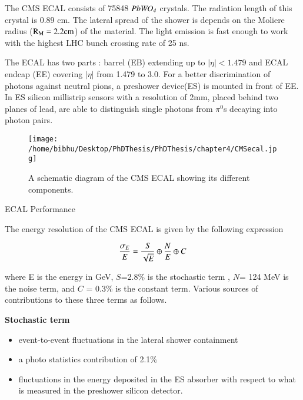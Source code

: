 The CMS ECAL consists of 75848 $\it PbWO_{4}$ crystals. The radiation length of this crystal is 0.89 cm. The lateral spread of the shower is depends on the Moliere radius ($\rm R_{M}= 2.2 cm$) of the material. The light emission is fast enough to work with the highest LHC bunch crossing rate of 25 ns. 

The ECAL has two parts :  barrel (EB) extending up to $|\eta| < 1.479$ and ECAL endcap (EE) covering $|\eta|$ from 1.479 to 3.0.  For a better discrimination of photons against neutral pions, a preshower device(ES) is mounted in front of EE. In ES silicon millistrip sensors with a resolution of 2mm, placed behind two planes of lead, are able to distinguish single photons from $\pi^{0}$s decaying into photon pairs.

\begin{figure}[H]
    \centering  
    \texttt{[image: /home/bibhu/Desktop/PhDThesis/PhDThesis/chapter4/CMSecal.jpg]}
    \caption{ \small A schematic diagram of the CMS ECAL  showing its different components.}
    \label{fig:CMSecal}
\end{figure}


{\Large ECAL Performance }

The energy resolution of the CMS ECAL is given by  the following expression 


\begin{equation} \label{ecalresolution}
\it \frac{\sigma_{E}}{E} = \frac{S}{\sqrt{E}} \oplus \frac{N}{E} \oplus C
\end{equation}
 
where E is the energy in GeV, $S$=2.8\% is the stochastic term , $N$= 124 MeV is the noise term, and $C$ = 0.3\% is the constant term. Various sources of contributions to these three terms as follows.

{\bf Stochastic term}
\vspace{-0.2in}
\begin{itemize}
\item event-to-event fluctuations in the lateral shower containment \vspace{-0.2in}
\item a photo statistics contribution of 2.1\% \vspace{-0.2in}
\item fluctuations in the energy deposited in the ES absorber with respect to what is measured in the preshower silicon detector. \vspace{-0.2in}
\end{itemize} 

